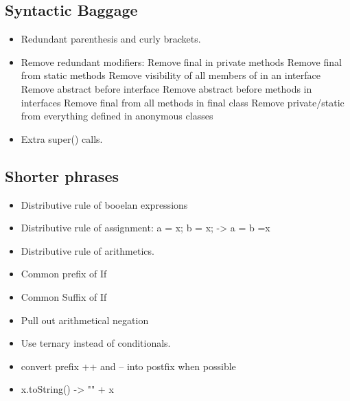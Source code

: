 \subsection{Syntactic Baggage}
\begin{itemize}
  \item Redundant parenthesis and curly brackets.
  \item Remove redundant modifiers: Remove final in private methods
        Remove final from static methods
        Remove visibility of all members of in an interface
        Remove abstract before interface
        Remove abstract before methods in interfaces
        Remove final from all  methods in final class
        Remove private/static from everything defined in anonymous classes
  \item Extra super() calls.
\end{itemize}

\subsection{Shorter phrases}
\begin{itemize}
  \item Distributive rule of booelan expressions
  \item Distributive rule of assignment: a = x; b = x; -> a = b =x
  \item Distributive rule of arithmetics.
  \item Common prefix of If
  \item Common Suffix of If
  \item Pull out arithmetical negation
  \item Use ternary instead of conditionals.
  \item convert prefix ++ and -- into postfix when possible
  \item x.toString() -> "" + x
\end{itemize}

